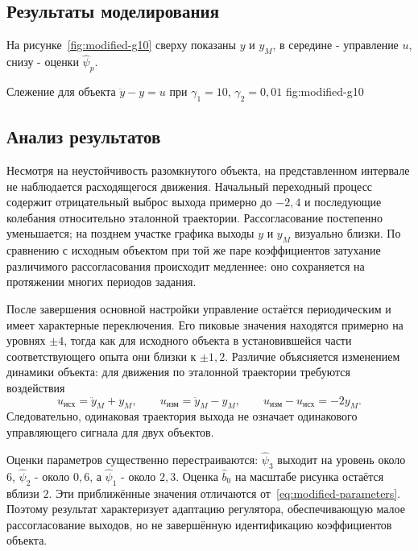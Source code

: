 \subsection{Результаты моделирования}

На рисунке~\ref{fig:modified-g10} сверху показаны $y$ и $y_M$,
в середине - управление $u$, снизу - оценки $\hat\psi_p$.

  {Слежение для объекта $\ddot y-y=u$ при $\gamma_1=10$, $\gamma_2=0{,}01$}
  {fig:modified-g10}


\subsection{Анализ результатов}

Несмотря на неустойчивость разомкнутого объекта,
на представленном интервале не наблюдается расходящегося движения.
Начальный переходный процесс содержит отрицательный выброс
выхода примерно до $-2{,}4$ и последующие колебания относительно
эталонной траектории. Рассогласование постепенно уменьшается;
на позднем участке графика выходы $y$ и $y_M$ визуально близки.
По сравнению с исходным объектом при той же паре коэффициентов
затухание различимого рассогласования происходит медленнее:
оно сохраняется на протяжении многих периодов задания.

После завершения основной настройки управление остаётся
периодическим и имеет характерные переключения.
Его пиковые значения находятся примерно на уровнях $\pm4$,
тогда как для исходного объекта в установившейся части
соответствующего опыта они близки к $\pm1{,}2$.
Различие объясняется изменением динамики объекта:
для движения по эталонной траектории требуются воздействия
\begin{equation}
  u_{\text{исх}}=\ddot y_M+y_M,\qquad
  u_{\text{изм}}=\ddot y_M-y_M,\qquad
  u_{\text{изм}}-u_{\text{исх}}=-2y_M.
  \label{eq:required-inputs}
\end{equation}
Следовательно, одинаковая траектория выхода не означает
одинакового управляющего сигнала для двух объектов.

Оценки параметров существенно перестраиваются:
$\hat\psi_3$ выходит на уровень около $6$,
$\hat\psi_2$ - около $0{,}6$,
а $\hat\psi_1$ - около $2{,}3$.
Оценка $\hat b_0$ на масштабе рисунка остаётся вблизи $2$.
Эти приближённые значения отличаются
от~\eqref{eq:modified-parameters}.
Поэтому результат характеризует адаптацию регулятора,
обеспечивающую малое рассогласование выходов,
но не завершённую идентификацию коэффициентов объекта.


